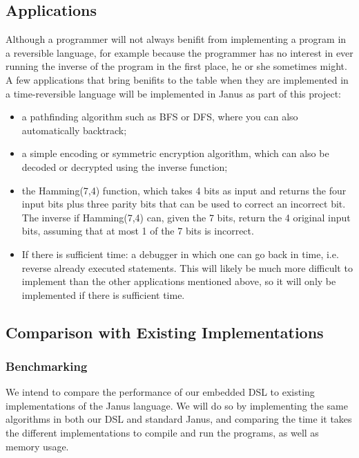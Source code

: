 \documentclass[12pt,a4paper]{article}
\begin{document}
	\subsection{Applications}
	Although a programmer will not always benifit from implementing a program in a reversible language, for example because the programmer has no interest in ever running the inverse of the program in the first place, he or she sometimes might. A few applications that bring benifits to the table when they are implemented in a time-reversible language will be implemented in Janus as part of this project:
	\begin{itemize}
		\item
			a pathfinding algorithm such as BFS or DFS, where you can also automatically backtrack;
	        \item
	        		a simple encoding or symmetric encryption algorithm, which can also be decoded or decrypted using the inverse function;
	        	\item
			the Hamming(7,4) function, which takes 4 bits as input and returns the four input bits plus three parity bits that can be used to correct an incorrect bit\cite{hamming}. The inverse if Hamming(7,4) can, given the 7 bits, return the 4 original input bits, assuming that at most 1 of the 7 bits is incorrect.
        		\item
			If there is sufficient time: a debugger in which one can go back in time, i.e. reverse already executed statements. This will likely be much more difficult to implement than the other applications mentioned above, so it will only be implemented if there is sufficient time.
	\end{itemize}
	
	\subsection{Comparison with Existing Implementations}
    \subsubsection{Benchmarking}
    We intend to compare the performance of our embedded DSL to existing implementations of the Janus language. We will do so by implementing the same algorithms in both our DSL and standard Janus, and comparing the time it takes the different implementations to compile and run the programs, as well as memory usage.
\end{document}
